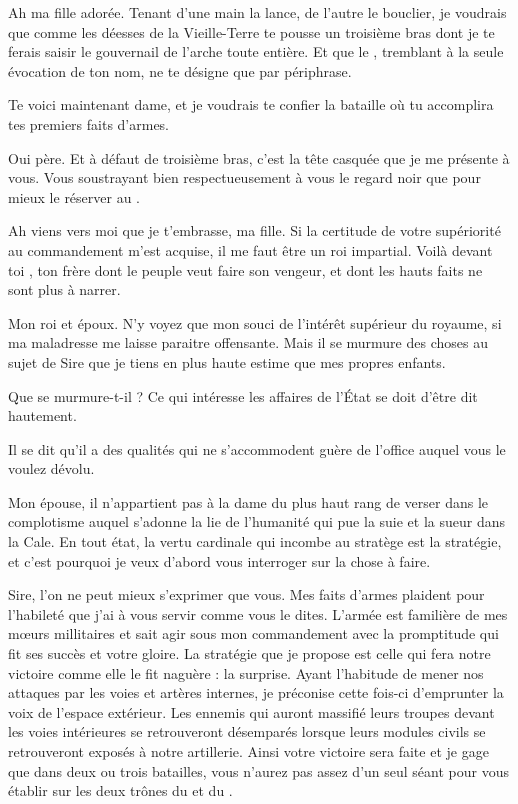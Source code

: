 \begin{drama}
  \roispeaks Ah ma fille adorée. Tenant d’une main la lance, de l’autre le bouclier, je voudrais que comme les déesses de la Vieille-Terre te pousse un troisième bras dont je te ferais saisir le gouvernail de l’arche toute entière. Et que le \campoppose{}, tremblant à la seule évocation de ton nom, ne te désigne que par périphrase.

  Te voici maintenant dame, et je voudrais te confier la bataille où tu accomplira tes premiers faits d’armes.


  \princessespeaks Oui père. Et à défaut de troisième bras, c’est la tête casquée que je me présente à vous. Vous soustrayant bien respectueusement à vous le regard noir que pour mieux le réserver au \campoppose{}.

  \roispeaks Ah viens vers moi que je t’embrasse, ma fille. Si la certitude de votre supériorité au commandement m’est acquise, il me faut être un roi impartial. Voilà devant toi \elena{}, ton frère dont le peuple veut faire son vengeur, et \general{} dont les hauts faits ne sont plus à narrer.

  \reinespeaks Mon roi et époux. N’y voyez que mon souci de l’intérêt supérieur du royaume, si ma maladresse me laisse paraitre offensante. Mais il se murmure des choses au sujet de Sire \elena{} que je tiens en plus haute estime que mes propres enfants.

  \roispeaks Que se murmure-t-il ?  Ce qui intéresse les affaires de l’État se doit d’être dit hautement.

  \reinespeaks Il se dit qu’il a des qualités qui ne s’accommodent guère de l’office auquel vous le voulez dévolu.

  \roispeaks Mon épouse, il n’appartient pas à la dame du plus haut rang de verser dans le complotisme auquel s’adonne la lie de l’humanité qui pue la suie et la sueur dans la Cale.
  En tout état, la vertu cardinale qui incombe au stratège est la stratégie,  et c’est pourquoi je veux d’abord vous interroger \general{} sur la chose à faire.

  \generalspeaks Sire, l’on ne peut mieux s’exprimer que vous. Mes faits d’armes plaident pour l’habileté que j’ai à vous servir comme vous le dites. L’armée est familière de mes mœurs millitaires et sait agir sous mon commandement avec la promptitude qui fit ses succès et votre gloire. La stratégie que je propose est celle qui fera notre victoire comme elle le fit naguère : la surprise. Ayant l’habitude de mener nos attaques par les voies et artères internes, je préconise cette fois-ci d’emprunter la voix de l’espace extérieur. Les ennemis qui auront massifié leurs troupes devant les voies intérieures se retrouveront désemparés lorsque leurs modules civils se retrouveront exposés à notre artillerie. Ainsi votre victoire sera faite et je gage que dans deux ou trois batailles, vous n’aurez pas assez d’un seul séant pour vous établir sur les deux trônes du \campprincipal{} et du \campoppose{}.


\end{drama}

